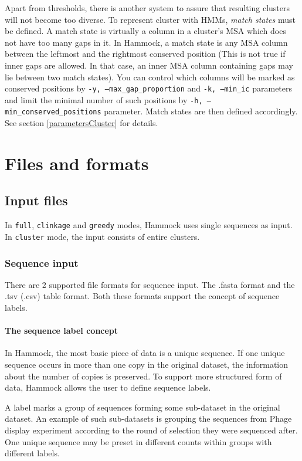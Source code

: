 \documentclass[11pt, a4paper, twoside, titlepage]{article}
\begin{document}
Apart from thresholds, there is another system to assure that resulting clusters will not become too diverse. To represent cluster with HMMs, \textit{match states} must be defined. A match state is virtually a column in a cluster's MSA which does not have too many gaps in it. In Hammock, a match state is any MSA column between the leftmost and the rightmost conserved position (This is not true if inner gaps are allowed. In that case, an inner MSA column containing gaps may lie between two match states).  You can control which columns will be marked as conserved positions by \texttt{-y, --max\_gap\_proportion} and \texttt{-k, --min\_ic} parameters and limit the minimal number of such positions by \texttt{-h, --min\_conserved\_positions} parameter. Match states are then defined accordingly. See section \ref{parametersCluster} for details. 




\section{Files and formats}
\label{filesandformats}
\subsection{Input files}
\label{inputfiles}
In \texttt{full}, \texttt{clinkage} and \texttt{greedy} modes, Hammock uses single sequences as input. In \texttt{cluster} mode, the input consists of entire clusters.

\subsubsection{Sequence input}
There are 2 supported file formats for sequence input. The .fasta format and the .tsv (.csv) table format. Both these formats support the concept of sequence labels. 

\paragraph{The sequence label concept} \label{labelConcept} In Hammock, the most basic piece of data is a unique sequence. If one unique sequence occurs in more than one copy in the original dataset, the information about the number of copies is preserved. To support more structured form of data, Hammock allows the user to define sequence labels. 

A label marks a group of sequences forming some sub-dataset in the original dataset. An example of such sub-datasets is grouping the sequences from Phage display experiment according to the round of selection they were sequenced after. One unique sequence may be preset in different counts within groups with different labels. 
\end{document}
